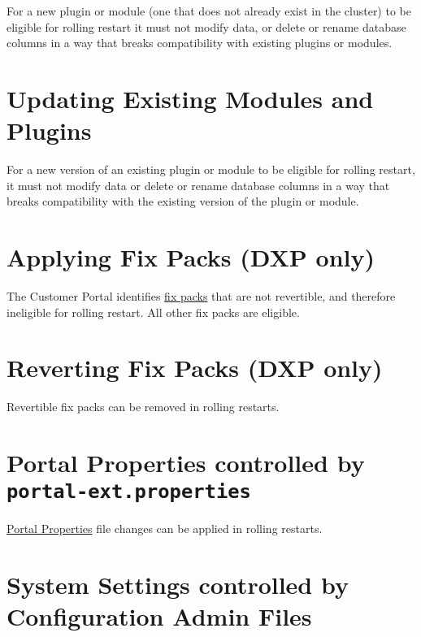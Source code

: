 For a new plugin or module (one that does not already exist in the
cluster) to be eligible for rolling restart it must not modify data, or
delete or rename database columns in a way that breaks compatibility
with existing plugins or modules.

\section{Updating Existing Modules and
Plugins}\label{updating-existing-modules-and-plugins}

For a new version of an existing plugin or module to be eligible for
rolling restart, it must not modify data or delete or rename database
columns in a way that breaks compatibility with the existing version of
the plugin or module.

\section{Applying Fix Packs (DXP
only)}\label{applying-fix-packs-dxp-only}

The Customer Portal identifies
\href{/docs/7-2/deploy/-/knowledge_base/d/maintaining-liferay}{fix
packs} that are not revertible, and therefore ineligible for rolling
restart. All other fix packs are eligible.

\section{Reverting Fix Packs (DXP
only)}\label{reverting-fix-packs-dxp-only}

Revertible fix packs can be removed in rolling restarts.

\section{\texorpdfstring{Portal Properties controlled by
\texttt{portal-ext.properties}}{Portal Properties controlled by portal-ext.properties}}\label{portal-properties-controlled-by-portal-ext.properties}

\href{@platform-ref@/7.2-latest/propertiesdoc/portal.properties.html}{Portal
Properties} file changes can be applied in rolling restarts.

\section{System Settings controlled by Configuration Admin
Files}\label{system-settings-controlled-by-configuration-admin-files}


